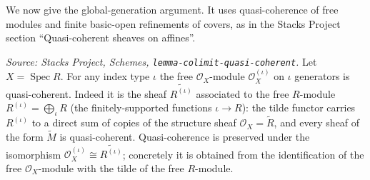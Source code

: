We now give the global-generation argument. It uses quasi-coherence of free modules
and finite basic-open refinements of covers, as in the Stacks Project section
``Quasi-coherent sheaves on affines''.

\begin{lemma}\leanok
  \label{lem:free_isQuasicoherent}
  \textit{Source: Stacks Project, Schemes, \texttt{lemma-colimit-quasi-coherent}.}
  Let \(X = \operatorname{Spec} R\). For any index type \(\iota\) the free
  \(\mathcal{O}_X\)-module \(\mathcal{O}_X^{(\iota)}\) on \(\iota\) generators is
  quasi-coherent. Indeed it is the sheaf \(\widetilde{R^{(\iota)}}\) associated to the
  free \(R\)-module \(R^{(\iota)} = \bigoplus_{\iota} R\) (the finitely-supported
  functions \(\iota \to R\)): the tilde functor carries \(R^{(\iota)}\) to a direct sum
  of copies of the structure sheaf \(\mathcal{O}_X = \widetilde{R}\), and every sheaf of
  the form \(\widetilde{M}\) is quasi-coherent. Quasi-coherence is preserved under the
  isomorphism \(\mathcal{O}_X^{(\iota)} \cong \widetilde{R^{(\iota)}}\); concretely it is
  obtained from the identification of the free \(\mathcal{O}_X\)-module with the
  tilde of the free \(R\)-module.
\end{lemma}

